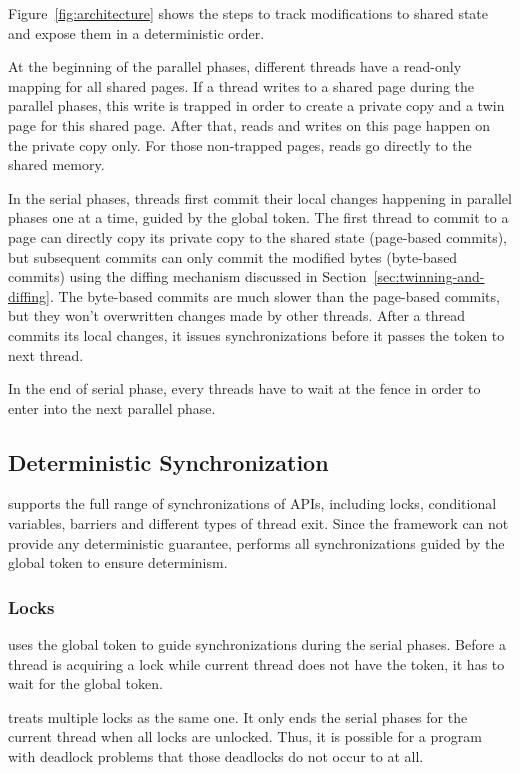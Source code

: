 Figure~\ref{fig:architecture} shows the steps to track modifications to shared state and expose them in a deterministic order.  

At the beginning of the parallel phases, different threads have a read-only mapping for all shared pages. If a thread writes to a shared page during the parallel phases, this write is trapped in order to create a private copy and a twin page for this shared page. After that, reads and writes on this page happen on the private copy only. For those non-trapped pages, reads go directly to the shared memory.  

In the serial phases, threads first commit their local changes happening in parallel phases one at a time, guided by the global token.  The first thread to commit to a page can directly copy its private copy to the shared state (page-based commits), but subsequent commits can only commit the modified bytes (byte-based commits) using the diffing mechanism discussed in Section~\ref{sec:twinning-and-diffing}. The byte-based commits are much slower than the page-based commits, but  they won't overwritten changes made by other threads.  After a thread commits its local changes, it issues synchronizations before it passes the token to next thread. 

In the end of serial phase, every threads have to wait at the fence in order to enter into the next parallel phase. 

\subsection{Deterministic Synchronization}
\label{sec:synchronization}

\dthreads{} supports the full range of synchronizations of
\pthreads{} APIs, including locks, conditional variables, barriers and different types of thread exit. Since the\sheriff{} framework can not provide any deterministic guarantee, \dthreads{} performs all synchronizations guided by the global token to ensure determinism. 

\subsubsection{Locks}
\dthreads{} uses the global token to guide synchronizations during the serial phases. Before a thread is acquiring a lock while current thread does not have the token, it has to wait for the global token. 

\dthreads{} treats multiple locks as the same one. It only ends the serial phases for the current thread when all locks are unlocked. Thus, it is possible for a program with deadlock problems that those deadlocks do not occur to \dthreads{} at all. 

